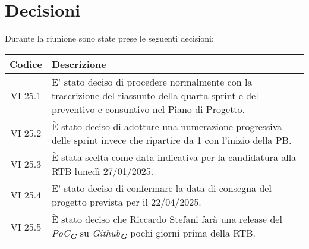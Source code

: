 
\section{Decisioni}

Durante la riunione sono state prese le seguenti decisioni:

\vspace{0.5cm}

\begin{table}[htbp]
    \centering
    \begin{tabular}{|c|p{}|}
        \hline
        \rowcolor[gray]{0.75}
        \textbf{Codice} & \textbf{Descrizione}\\
        \hline
        VI 25.1 & E' stato deciso di procedere normalmente con la trascrizione del riassunto della quarta sprint e del preventivo e consuntivo
        nel Piano di Progetto.\\
        \hline
        VI 25.2 & È stato deciso di adottare una numerazione progressiva delle sprint invece che ripartire da 1 con l'inizio della PB.\\
        \hline
        VI 25.3 & È stata scelta come data indicativa per la candidatura alla RTB lunedì 27/01/2025.\\
        \hline
        VI 25.4 & E' stato deciso di confermare la data di consegna del progetto prevista per il 22/04/2025.\\
        \hline
        VI 25.5 & È stato deciso che Riccardo Stefani farà una release del \emph{PoC}\textsubscript{\textit{\textbf{G}}} su \emph{Github}\textsubscript{\textit{\textbf{G}}} pochi giorni prima della RTB.\\
        \hline
    \end{tabular}
\end{table}
